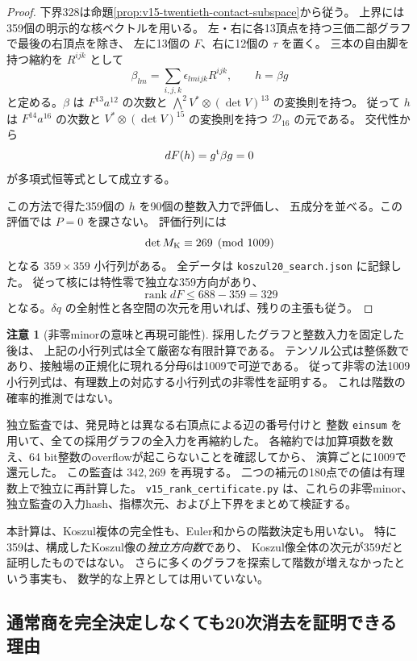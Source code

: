 \documentclass[a4paper,11pt]{ltjsarticle}
\theoremstyle{definition}
\newtheorem{remark}[theorem]{注意}
\begin{document}
\begin{proof}
下界328は命題\ref{prop:v15-twentieth-contact-subspace}から従う。
上界には359個の明示的な核ベクトルを用いる。
左・右に各13頂点を持つ三価二部グラフで最後の右頂点を除き、
左に13個の $F$、右に12個の $\tau$ を置く。
三本の自由脚を持つ縮約を $R^{ijk}$ として
\[
       \beta_{lm}=\sum_{i,j,k}\epsilon_{lmijk}R^{ijk},
       \qquad h=\beta g
\]
と定める。$\beta$ は $F^{13}a^{12}$ の次数と
$\bigwedge^2V^*\otimes(\det V)^{13}$ の変換則を持つ。
従って $h$ は $F^{14}a^{16}$ の次数と
$V^*\otimes(\det V)^{15}$ の変換則を持つ $\mathcal D_{16}$ の元である。
交代性から
\[
                      dF(h)=g^{\rm t}\beta g=0
\]
が多項式恒等式として成立する。

この方法で得た359個の $h$ を90個の整数入力で評価し、
五成分を並べる。この評価では $P=0$ を課さない。
評価行列には
\[
                   \det M_{\rm K}\equiv269\pmod{1009}
\]
となる $359\times359$ 小行列がある。
全データは \texttt{koszul20\_search.json} に記録した。
従って核には特性零で独立な359方向があり、
\[
                        \operatorname{rank}dF\le688-359=329
\]
となる。$\delta q$ の全射性と各空間の次元を用いれば、残りの主張も従う。
\end{proof}

\begin{remark}[非零minorの意味と再現可能性]
\label{rem:v15-twentieth-rank-certificate-scope}
採用したグラフと整数入力を固定した後は、
上記の小行列式は全て厳密な有限計算である。
テンソル公式は整係数であり、接触場の正規化に現れる分母6は1009で可逆である。
従って非零の法1009小行列式は、有理数上の対応する小行列式の非零性を証明する。
これは階数の確率的推測ではない。

独立監査では、発見時とは異なる右頂点による辺の番号付けと
整数 \texttt{einsum} を用いて、全ての採用グラフの全入力を再縮約した。
各縮約では加算項数を数え、64 bit整数のoverflowが起こらないことを確認してから、
演算ごとに1009で還元した。
この監査は $342,269$ を再現する。
二つの補元の180点での値は有理数上で独立に再計算した。
\nolinkurl{v15_rank_certificate.py} は、これらの非零minor、
独立監査の入力hash、指標次元、および上下界をまとめて検証する。

本計算は、Koszul複体の完全性も、Euler和からの階数決定も用いない。
特に359は、構成したKoszul像の\emph{独立方向数}であり、
Koszul像全体の次元が359だと証明したものではない。
さらに多くのグラフを探索して階数が増えなかったという事実も、
数学的な上界としては用いていない。
\end{remark}

\subsection{通常商を完全決定しなくても20次消去を証明できる理由}
\label{subsec:v15-certified-subspace-suffices}
\end{document}
